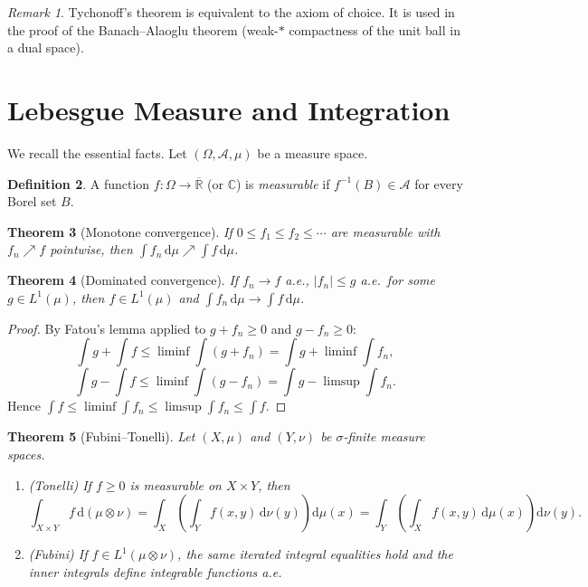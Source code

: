 \documentclass[a4paper,12pt]{book}
\newcommand{\R}{\mathbb{R}}
\newcommand{\C}{\mathbb{C}}
\newcommand{\dd}{\mathrm{d}}
\newcommand{\abs}[1]{\left| #1 \right|}
\theoremstyle{definition}
\newtheorem{definition}{Definition}[chapter]
\theoremstyle{plain}
\newtheorem{theorem}[definition]{Theorem}
\theoremstyle{remark}
\newtheorem{remark}[definition]{Remark}
\begin{document}
\begin{remark}
Tychonoff's theorem is equivalent to the axiom of choice. It is used in the
proof of the Banach--Alaoglu theorem (weak-$*$
compactness of the unit ball in a dual space).
\end{remark}


\section{Lebesgue Measure and Integration}\label{sec:lebesgue-review}


We recall the essential facts. Let $(\Omega, \mathcal{A}, \mu)$ be a measure space.

\begin{definition}\label{def:measurable-function}
A function $f \colon \Omega \to \overline{\R}$ (or $\C$) is \emph{measurable} if
$f^{-1}(B) \in \mathcal{A}$ for every Borel set $B$.
\end{definition}

\begin{theorem}[Monotone convergence]\label{thm:monotone-conv}
If $0 \le f_1 \le f_2 \le \cdots$ are measurable with $f_n \nearrow f$ pointwise,
then $\int f_n\, \dd\mu \nearrow \int f\, \dd\mu$.
\end{theorem}

\begin{theorem}[Dominated convergence]\label{thm:dominated-conv}
If $f_n \to f$ a.e., $\abs{f_n} \le g$ a.e.\ for some $g \in L^1(\mu)$, then
$f \in L^1(\mu)$ and $\int f_n\, \dd\mu \to \int f\, \dd\mu$.
\end{theorem}

\begin{proof}
By Fatou's lemma applied to $g + f_n \ge 0$ and $g - f_n \ge 0$:
\[
  \int g + \int f \le \liminf \int (g + f_n) = \int g + \liminf \int f_n,
\]
\[
  \int g - \int f \le \liminf \int (g - f_n) = \int g - \limsup \int f_n.
\]
Hence $\int f \le \liminf \int f_n \le \limsup \int f_n \le \int f$.
\end{proof}

\begin{theorem}[Fubini--Tonelli]\label{thm:fubini}
Let $(X, \mu)$ and $(Y, \nu)$ be $\sigma$-finite measure spaces.
\begin{enumerate}[label=(\roman*)]
  \item (Tonelli) If $f \ge 0$ is measurable on $X \times Y$, then
  \[
    \int_{X \times Y} f\, \dd(\mu \otimes \nu)
    = \int_X \left(\int_Y f(x,y)\, \dd\nu(y)\right) \dd\mu(x)
    = \int_Y \left(\int_X f(x,y)\, \dd\mu(x)\right) \dd\nu(y).
  \]
  \item (Fubini) If $f \in L^1(\mu \otimes \nu)$, the same iterated integral
        equalities hold and the inner integrals define integrable functions a.e.
\end{enumerate}
\end{theorem}
\end{document}
